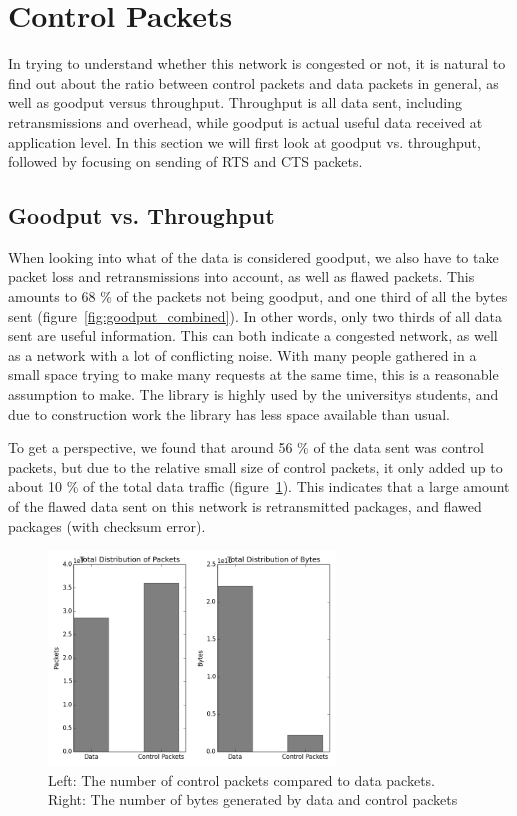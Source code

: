 \documentclass[letterpaper,twocolumn,10pt]{article}
\begin{document}
\section{Control Packets}

In trying to understand whether this network is congested or not, it is natural to find out about the ratio between control packets and data packets in general, as well as goodput versus throughput. Throughput is all data sent, including retransmissions and overhead, while goodput is actual useful data received at application level. In this section we will first look at goodput vs. throughput, followed by focusing on sending of RTS and CTS packets.

\subsection{Goodput vs. Throughput}

When looking into what of the data is considered goodput, we also have to take packet loss and retransmissions into account, as well as flawed packets. This amounts to 68 \% of the packets not being goodput, and one third of all the bytes sent (figure~\ref{fig:goodput_combined}). In other words, only two thirds of all data sent are useful information. This can both indicate a congested network, as well as a network with a lot of conflicting noise. With many people gathered in a small space trying to make many requests at the same time, this is a reasonable assumption to make. The library is highly used by the universitys students, and due to construction work the library has less space available than usual.

To get a perspective, we found that around 56 \% of the data sent was control packets, but due to the relative small size of control packets, it only added up to about 10 \% of the total data traffic (figure~\ref{fig:control_combined}). This indicates that a large amount of the flawed data sent on this network is retransmitted packages, and flawed packages (with checksum error).

\begin{figure}[!htb] 
\begin{center} 
\includegraphics[width=3in]{control_combined.png} 
\caption{Left: The number of control packets compared to data packets. Right: The number of bytes generated by data and control packets} 
\label{fig:control_combined} 
\end{center} 
\end{figure}
\end{document}
